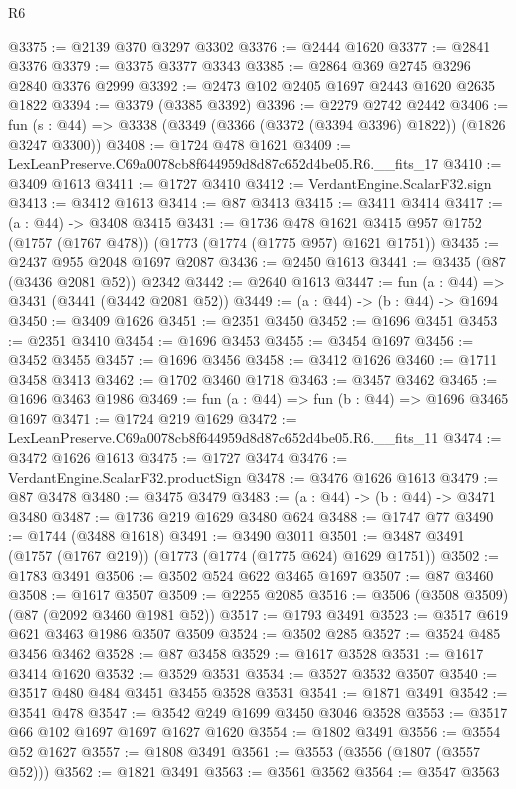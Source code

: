 \begin{lexlean}{R6}
\begin{coremodule}
@3375 := @2139 @370 @3297 @3302
@3376 := @2444 @1620
@3377 := @2841 @3376
@3379 := @3375 @3377 @3343
@3385 := @2864 @369 @2745 @3296 @2840 @3376 @2999
@3392 := @2473 @102 @2405 @1697 @2443 @1620 @2635 @1822
@3394 := @3379 (@3385 @3392)
@3396 := @2279 @2742 @2442
@3406 := fun (s : @44) => @3338 (@3349 (@3366 (@3372 (@3394 @3396) @1822)) (@1826 @3247 @3300))
@3408 := @1724 @478 @1621
@3409 := LexLeanPreserve.C69a0078cb8f644959d8d87c652d4be05.R6.__fits_17
@3410 := @3409 @1613
@3411 := @1727 @3410
@3412 := VerdantEngine.ScalarF32.sign
@3413 := @3412 @1613
@3414 := @87 @3413
@3415 := @3411 @3414
@3417 := (a : @44) -> @3408 @3415
@3431 := @1736
    @478
    @1621
    @3415
    @957
    @1752
    (@1757 (@1767 @478))
    (@1773 (@1774 (@1775 @957) @1621 @1751))
@3435 := @2437 @955 @2048 @1697 @2087
@3436 := @2450 @1613
@3441 := @3435 (@87 (@3436 @2081 @52)) @2342
@3442 := @2640 @1613
@3447 := fun (a : @44) => @3431 (@3441 (@3442 @2081 @52))
@3449 := (a : @44) -> (b : @44) -> @1694
@3450 := @3409 @1626
@3451 := @2351 @3450
@3452 := @1696 @3451
@3453 := @2351 @3410
@3454 := @1696 @3453
@3455 := @3454 @1697
@3456 := @3452 @3455
@3457 := @1696 @3456
@3458 := @3412 @1626
@3460 := @1711 @3458 @3413
@3462 := @1702 @3460 @1718
@3463 := @3457 @3462
@3465 := @1696 @3463 @1986
@3469 := fun (a : @44) => fun (b : @44) => @1696 @3465 @1697
@3471 := @1724 @219 @1629
@3472 := LexLeanPreserve.C69a0078cb8f644959d8d87c652d4be05.R6.__fits_11
@3474 := @3472 @1626 @1613
@3475 := @1727 @3474
@3476 := VerdantEngine.ScalarF32.productSign
@3478 := @3476 @1626 @1613
@3479 := @87 @3478
@3480 := @3475 @3479
@3483 := (a : @44) -> (b : @44) -> @3471 @3480
@3487 := @1736 @219 @1629 @3480 @624
@3488 := @1747 @77
@3490 := @1744 (@3488 @1618)
@3491 := @3490 @3011
@3501 := @3487 @3491 (@1757 (@1767 @219)) (@1773 (@1774 (@1775 @624) @1629 @1751))
@3502 := @1783 @3491
@3506 := @3502 @524 @622 @3465 @1697
@3507 := @87 @3460
@3508 := @1617 @3507
@3509 := @2255 @2085
@3516 := @3506 (@3508 @3509) (@87 (@2092 @3460 @1981 @52))
@3517 := @1793 @3491
@3523 := @3517 @619 @621 @3463 @1986 @3507 @3509
@3524 := @3502 @285
@3527 := @3524 @485 @3456 @3462
@3528 := @87 @3458
@3529 := @1617 @3528
@3531 := @1617 @3414 @1620
@3532 := @3529 @3531
@3534 := @3527 @3532 @3507
@3540 := @3517 @480 @484 @3451 @3455 @3528 @3531
@3541 := @1871 @3491
@3542 := @3541 @478
@3547 := @3542 @249 @1699 @3450 @3046 @3528
@3553 := @3517 @66 @102 @1697 @1697 @1627 @1620
@3554 := @1802 @3491
@3556 := @3554 @52 @1627
@3557 := @1808 @3491
@3561 := @3553 (@3556 (@1807 (@3557 @52)))
@3562 := @1821 @3491
@3563 := @3561 @3562
@3564 := @3547 @3563

\end{coremodule}
\end{lexlean}

